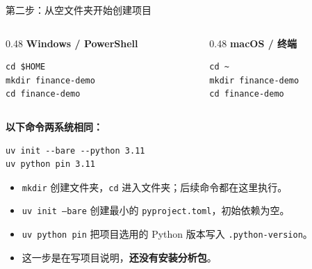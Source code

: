 \documentclass[9pt]{ctexbeamer}
\begin{document}
\begin{frame}[fragile]{第二步：从空文件夹开始创建项目}
  \begin{columns}[T,totalwidth=\textwidth]
    \begin{column}{0.48\textwidth}
      \textbf{Windows / PowerShell}
\begin{lstlisting}[language={},numbers=none]
cd $HOME
mkdir finance-demo
cd finance-demo
\end{lstlisting}
    \end{column}
    \begin{column}{0.48\textwidth}
      \textbf{macOS / 终端}
\begin{lstlisting}[language={},numbers=none]
cd ~
mkdir finance-demo
cd finance-demo
\end{lstlisting}
    \end{column}
  \end{columns}
  \textbf{以下命令两系统相同：}
\begin{lstlisting}[language={},numbers=none]
uv init --bare --python 3.11
uv python pin 3.11
\end{lstlisting}
  \begin{itemize}
    \item \texttt{mkdir} 创建文件夹，\texttt{cd} 进入文件夹；后续命令都在这里执行。
    \item \texttt{uv init --bare} 创建最小的 \texttt{pyproject.toml}，初始依赖为空。
    \item \texttt{uv python pin} 把项目选用的 Python 版本写入 \texttt{.python-version}。
    \item 这一步是在写项目说明，\textbf{还没有安装分析包}。
  \end{itemize}
\end{frame}
\end{document}
